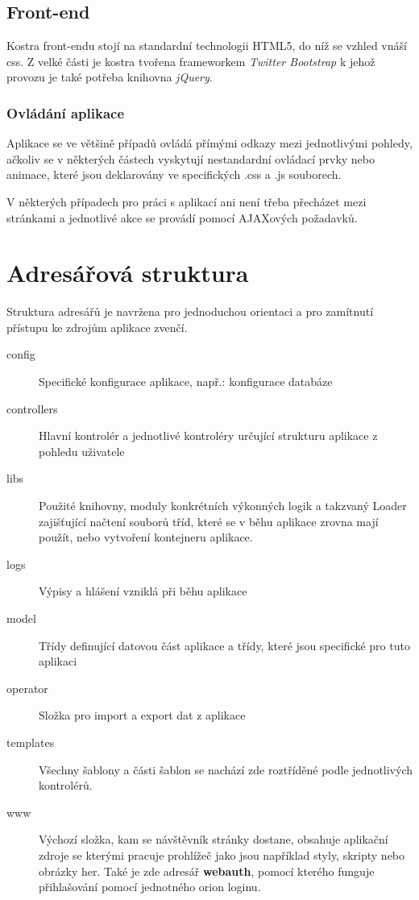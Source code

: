 \documentclass[12pt,a4paper]{article}
\let\oldsection\section
\renewcommand\section{\clearpage\oldsection}
\begin{document}
{\subsection{Front-end}}
Kostra front-endu stojí na standardní technologii HTML5, do níž se vzhled vnáší css. Z velké části je kostra tvořena frameworkem \textit{Twitter Bootstrap} k jehož provozu je také potřeba knihovna \textit{jQuery}.
{\subsubsection{Ovládání aplikace}}
Aplikace se ve většině případů ovládá přímými odkazy mezi jednotlivými pohledy, ačkoliv se v některých částech vyskytují nestandardní ovládací prvky nebo animace, které jsou deklarovány ve specifických .css a .js souborech.

V některých případech pro práci s aplikací ani není třeba přecházet mezi stránkami a jednotlivé akce se provádí pomocí AJAXových požadavků.


{\section{Adresářová struktura}}
Struktura adresářů je navržena pro jednoduchou orientaci a pro zamítnutí přístupu ke zdrojům aplikace zvenčí.

\begin{description}
\item[config]
Specifické konfigurace aplikace, např.: konfigurace databáze
\item[controllers]
Hlavní kontrolér a jednotlivé kontroléry určující strukturu aplikace z pohledu uživatele
\item[libs]
Použité knihovny, moduly konkrétních výkonných logik a takzvaný Loader zajišťující načtení souborů tříd, které se v běhu aplikace zrovna mají použít, nebo vytvoření kontejneru aplikace.
\item[logs]
Výpisy a hlášení vzniklá při běhu aplikace
\item[model]
Třídy definující datovou část aplikace a třídy, které jsou specifické pro tuto aplikaci
\item[operator]
Složka pro import a export dat z aplikace
\item[templates]
Všechny šablony a části šablon se nachází zde roztříděné podle jednotlivých kontrolérů.
\item[www]
Výchozí složka, kam se návštěvník stránky dostane, obsahuje aplikační zdroje se kterými pracuje prohlížeč jako jsou například styly, skripty nebo obrázky her. Také je zde adresář \textbf{webauth}, pomocí kterého funguje přihlašování pomocí jednotného orion loginu.
\end{description}
\end{document}
